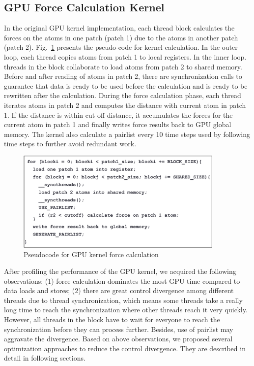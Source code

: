 \subsection{GPU Force Calculation Kernel}

In the original GPU kernel implementation, each thread block calculates the forces on the atoms in one patch (patch 1)
due to the atoms in another patch (patch 2). Fig.~\ref{figs:pseudocode} presents the pseudo-code for kernel calculation.
In the outer loop, each thread copies atoms from patch 1 to local registers. In the inner loop. threads in the block collaborate to
load atoms from patch 2 to shared memory. Before and after reading of atoms in patch 2, there are synchronization calls to guarantee
that data is ready to be used before the calculation and is ready to be rewritten after the calculation. During the force
calculation phase, each thread iterates atoms in patch 2 and computes the distance with current atom in patch 1.
If the distance is within cut-off distance, it accumulates the forces for the current atom in patch 1 and finally writes force results
back to GPU global memory. The kernel also calculate a pairlist every 10 time steps used by following time steps to further avoid redundant work. 

\begin{figure}[h]
\centering
\setlength{\abovecaptionskip}{-1pt}
\setlength{\belowcaptionskip}{-2pt}
\includegraphics[width=4.0in]{figs/pseudocode-eps-converted-to}
\caption{Pseudocode for GPU kernel force calculation}
\label{figs:pseudocode}
\end{figure}

After profiling the performance of the GPU kernel, we acquired the following observations:
(1) force calculation dominates the most GPU time compared to data loads and stores;
(2) there are great control divergence among different threads due to thread synchronization, which means some threads take a really long time
to reach the synchronization where other threads reach it very quickly. However, all threads in the block have to wait for everyone to
reach the synchronization before they can process further. Besides, use of pairlist may aggravate the divergence.
Based on above observations, we proposed several optimization approaches to reduce the control
divergence. They are described in detail in following sections.

